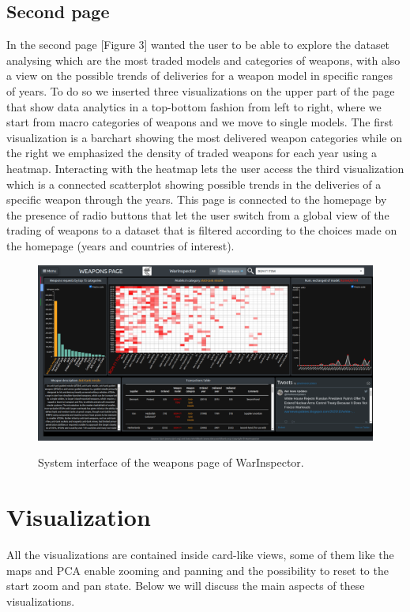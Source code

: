 \documentclass{article}
\begin{document}
\begin{multicols}{2}
\begin{figure}[H]
\end{figure}

\subsection{Second page}
In the second page [Figure 3] wanted the user to be able to explore the dataset analysing which are the most traded models and categories of weapons, with also a view on the possible trends of deliveries for a weapon model in specific ranges of years.
To do so we inserted three visualizations on the upper part of the page that show data analytics in a top-bottom fashion from left to right, where we start from macro categories of weapons and we move to single models. The first visualization is a barchart showing the most delivered weapon categories while on the right we emphasized the density of traded weapons for each year using  a heatmap. Interacting with the heatmap lets the user access the third visualization which is a connected scatterplot showing possible trends in the deliveries of a specific weapon through the years. 
This page is connected to the homepage by the presence of radio buttons that let the user switch from a global view of the trading of weapons to a dataset that is filtered according to the choices made on the homepage (years and countries of interest). 


\begin{figure}[H]
\centering
\includegraphics[scale=0.115,center]{./fig/screen2.png}
   \label{fig:va2}
    \caption{System interface of the weapons page of WarInspector.}

\end{figure}

\section{Visualization}
All the visualizations are contained inside card-like views, some of them like the maps and PCA enable zooming and panning and the possibility to reset to the start zoom and pan state.
Below we will discuss the main aspects of these visualizations.  

\end{multicols}
\end{document}

